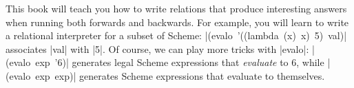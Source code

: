 This book will teach you how to write relations that produce
interesting answers when running both forwards and backwards.  For
example, you will learn to write a relational interpreter for a subset
of Scheme: \mbox{\scheme|(evalo '((lambda (x) x) 5) val)|} associates
\scheme|val| with \schemeresult|5|. Of course, we can play more tricks
with \scheme|evalo|: \mbox{\scheme|(evalo exp '6)|} generates legal
Scheme expressions that \emph{evaluate} to 6, while
 \mbox{\scheme|(evalo exp exp)|} generates Scheme expressions that evaluate to themselves.

\newpage




